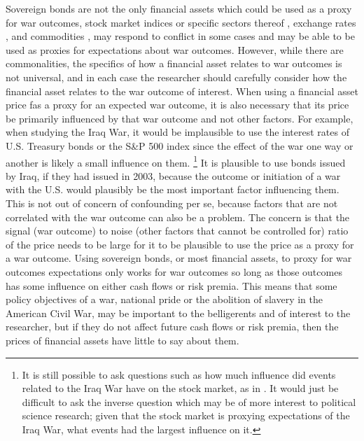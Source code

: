 Sovereign bonds are not the only financial assets which could be used as a proxy for war outcomes, stock market indices or specific sectors thereof \textcites{ChenSiems2004}{SchneiderTroeger2006}{WolfersZitzewitz2009}, exchange rates \textcites{Hall2004}, and commodities \textcites{WolfersZitzewitz2009}, may respond to conflict in some cases and may be able to be used as proxies for expectations about war outcomes.
However, while there are commonalities, the specifics of how a financial asset relates to war outcomes is not universal, and in each case the researcher should carefully consider how the financial asset relates to the war outcome of interest.
When using a financial asset price fas a proxy for an expected war outcome, it is also necessary that its price be primarily influenced by that war outcome and not other factors.
For example, when studying the Iraq War, it would be implausible to use the interest rates of U.S. Treasury bonds or the S\&P 500 index since the effect of the war one way or another is likely a small influence on them.%
\footnote{
  It is still possible to ask questions such as how much influence did events related to the Iraq War have on the stock market, as in .
  It would just be difficult to ask the inverse question which may be of more interest to political science research; given that the stock market is proxying expectations of the Iraq War, what events had the largest influence on it.
 }
It is plausible to use bonds issued by Iraq, if they had issued in 2003, because the outcome or initiation of a war with the U.S. would plausibly be the most important factor influencing them.
This is not out of concern of confounding per se, because factors that are not correlated with the war outcome can also be a problem.
The concern is that the signal (war outcome) to noise (other factors that cannot be controlled for) ratio of the price needs to be large for it to be plausible to use the price as a proxy for a war outcome.
Using sovereign bonds, or most financial assets, to proxy for war outcomes expectations only works for war outcomes so long as those outcomes has some influence on either cash flows or risk premia.
This means that some policy objectives of a war, \eg{}national pride or the abolition of slavery in the American Civil War, may be important to the belligerents and of interest to the researcher, but if they do not affect future cash flows or risk premia, then the prices of financial assets have little to say about them.

